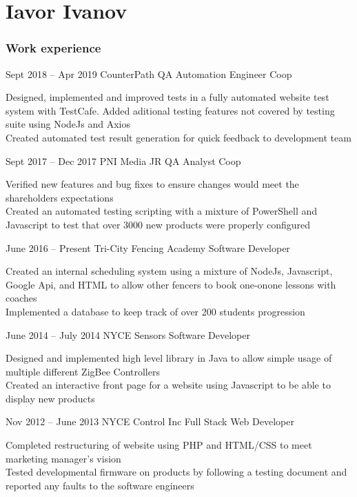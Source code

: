 \documentclass{tccv}
\begin{document}
\part{Iavor Ivanov}

\section{Work experience}

\begin{eventlist}

\item{Sept 2018 -- Apr 2019}
     {CounterPath}
     {QA Automation Engineer Coop}

Designed, implemented and improved tests in a fully automated website test system with TestCafe. Added aditional testing features not covered by testing suite using NodeJs and Axios \\
Created automated test result generation for quick feedback to development team \\


\item{Sept 2017 -- Dec 2017}
     {PNI Media}
     {JR QA Analyst Coop}

Verified new features and bug fixes to ensure changes would meet the
shareholders expectations \\
Created an automated testing scripting with a mixture of PowerShell and
Javascript to test that over 3000 new products were properly configured

\item{June 2016 -- Present}
     {Tri-City Fencing Academy}
     {Software Developer}
     
Created an internal scheduling system using a mixture of NodeJs,
Javascript, Google Api, and HTML to allow other fencers to book one-onone
lessons with coaches \\
Implemented a database to keep track of over 200 students progression

\item{June 2014 -- July 2014}
     {NYCE Sensors}
     {Software Developer}
     
Designed and implemented high level library in Java to allow simple usage
of multiple different ZigBee Controllers \\
Created an interactive front page for a website using Javascript to be able
to display new products

\item{Nov 2012 -- June 2013}
     {NYCE Control Inc}
     {Full Stack Web Developer}

Completed restructuring of website using PHP and HTML/CSS to meet
marketing manager's vision\\
Tested developmental firmware on products by following a testing
document and reported any faults to the software engineers

\end{eventlist}
\end{document}
